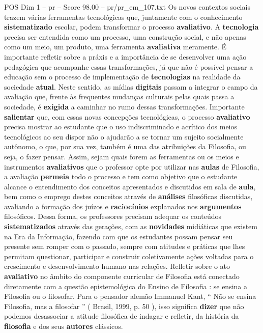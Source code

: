 \begin{textsample}{POS Dim 1 – pr – Score 98.00 – pr/pr\_em\_107.txt}
Os novos contextos sociais trazem várias ferramentas tecnológicas que, juntamente com o conhecimento \textbf{sistematizado} escolar, podem transformar o processo \textbf{avaliativo}.
A \textbf{tecnologia} precisa ser entendida como um processo, uma construção social, e não apenas como um meio, um produto, uma ferramenta \textbf{avaliativa} meramente.
É importante refletir sobre a práxis e a importância de se desenvolver uma ação pedagógica que acompanhe essas transformações, já que não é possível pensar a educação sem o processo de implementação de \textbf{tecnologias} na realidade da sociedade \textbf{atual}.
Neste sentido, as mídias \textbf{digitais} passam a integrar o campo da avaliação que, frente às frequentes mudanças culturais pelas quais passa a sociedade, é \textbf{exigida} a caminhar no rumo dessas transformações.
Importante \textbf{salientar} que, com essas novas concepções tecnológicas, o processo \textbf{avaliativo} precisa mostrar ao estudante que o uso indiscriminado e acrítico dos meios tecnológicos ao seu dispor não o ajudarão a se tornar um sujeito socialmente autônomo, o que, por sua vez, também é uma das atribuições da Filosofia, ou seja, o fazer pensar.
Assim, sejam quais forem as ferramentas ou os meios e instrumentos \textbf{avaliativos} que o professor opte por utilizar nas \textbf{aulas} de Filosofia, a avaliação \textbf{permeia} todo o processo e tem como objetivo que o estudante alcance o entendimento dos conceitos apresentados e discutidos em sala de \textbf{aula}, bem como o emprego destes conceitos através de \textbf{análises} filosóficas discutidas, avaliando a formação dos juízos e \textbf{raciocínios} explanados nos \textbf{argumentos} filosóficos.
Dessa forma, os professores precisam adequar os conteúdos \textbf{sistematizados} através das gerações, com as \textbf{novidades} midiáticas que existem na Era da Informação, fazendo com que os estudantes possam pensar seu presente sem romper com o passado, sempre com atitudes e práticas que lhes permitam questionar, participar e construir coletivamente ações voltadas para o crescimento e desenvolvimento humano nas relações.
Refletir sobre o ato \textbf{avaliativo} no âmbito do componente curricular de Filosofia está conectado diretamente com a questão epistemológica do Ensino de Filosofia : se ensina a Filosofia ou o filosofar.
Para o pensador alemão Immanuel Kant, “ Não se ensina Filosofia, mas a filosofar ” ( Brasil, 1999, p. 50 ), isso significa \textbf{dizer} que não podemos desassociar a atitude filosófica de indagar e refletir, da história da \textbf{filosofia} e dos seus \textbf{autores} clássicos.

\end{textsample}
